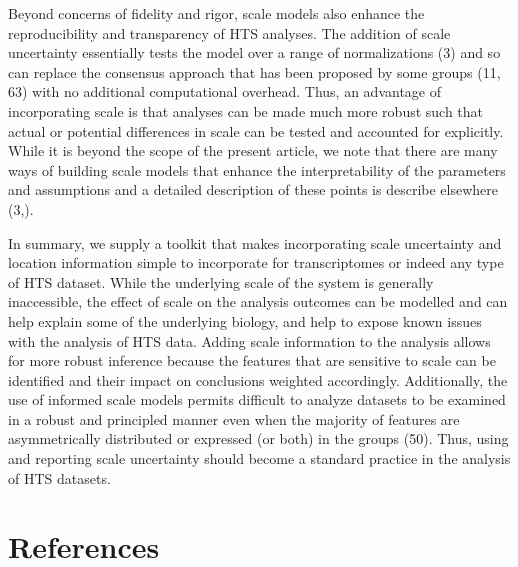 \documentclass[
]{article}
\begin{document}
Beyond concerns of fidelity and rigor, scale models also enhance the
reproducibility and transparency of HTS analyses. The addition of scale
uncertainty essentially tests the model over a range of normalizations
(3) and so can replace the consensus approach that has been proposed by
some groups (11, 63) with no additional computational overhead. Thus, an
advantage of incorporating scale is that analyses can be made much more
robust such that actual or potential differences in scale can be tested
and accounted for explicitly. While it is beyond the scope of the
present article, we note that there are many ways of building scale
models that enhance the interpretability of the parameters and
assumptions and a detailed description of these points is describe
elsewhere (3,).

In summary, we supply a toolkit that makes incorporating scale
uncertainty and location information simple to incorporate for
transcriptomes or indeed any type of HTS dataset. While the underlying
scale of the system is generally inaccessible, the effect of scale on
the analysis outcomes can be modelled and can help explain some of the
underlying biology, and help to expose known issues with the analysis of
HTS data. Adding scale information to the analysis allows for more
robust inference because the features that are sensitive to scale can be
identified and their impact on conclusions weighted accordingly.
Additionally, the use of informed scale models permits difficult to
analyze datasets to be examined in a robust and principled manner even
when the majority of features are asymmetrically distributed or
expressed (or both) in the groups (50). Thus, using and reporting scale
uncertainty should become a standard practice in the analysis of HTS
datasets.

\singlespacing

\section*{References}\label{references}
\end{document}
